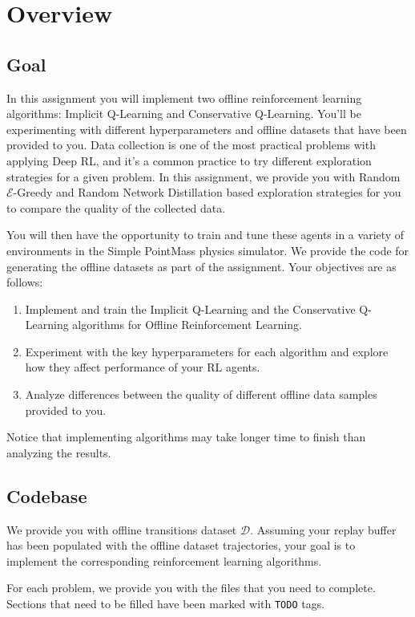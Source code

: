 \section{Overview}


\subsection*{Goal}
In this assignment you will implement two offline reinforcement learning algorithms: Implicit Q-Learning and Conservative Q-Learning. You'll be experimenting with different hyperparameters and offline datasets that have been provided to you. Data collection is one of the most practical problems with applying Deep RL, and it's a common practice to try different exploration strategies for a given problem. In this assignment, we provide you with Random $\mathcal{E}$-Greedy and Random Network Distillation based exploration strategies for you to compare the quality of the collected data.


You will then have the opportunity to train and tune these agents in a variety of environments in the Simple PointMass physics simulator. We provide the code for generating the offline datasets as part of the assignment. Your objectives are as follows:

\begin{enumerate} 
    \item Implement and train the Implicit Q-Learning and the Conservative Q-Learning algorithms for Offline Reinforcement Learning.
    \item Experiment with the key hyperparameters for each algorithm and explore how they affect performance of your RL agents.
    \item Analyze differences between the quality of different offline data samples provided to you. 
\end{enumerate}

Notice that implementing algorithms may take longer time to finish than analyzing the results.


\subsection*{Codebase}
 We provide you with offline transitions dataset $\mathcal{D}$. Assuming your replay buffer has been populated with the offline dataset trajectories, your goal is to implement the corresponding reinforcement learning algorithms.

For each problem, we provide you with the files that you need to complete. Sections that need to be filled have been marked with \texttt{TODO} tags.


